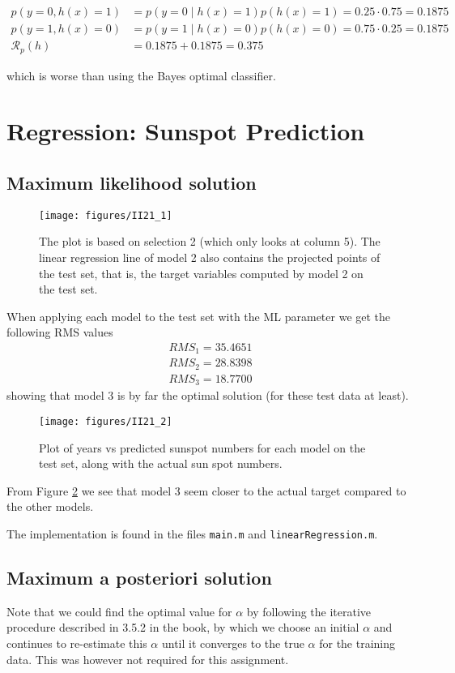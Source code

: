 \documentclass[a4paper, 11pt]{article}
\begin{document}
\begin{align*}
p(y=0,h(x)=1) &= p(y=0 \;|\; h(x)=1)p(h(x)=1) = 0.25 \cdot 0.75 = 0.1875 \\
p(y=1,h(x)=0) &= p(y=1 \;|\; h(x)=0)p(h(x)=0) = 0.75 \cdot 0.25 = 0.1875 \\
\mathcal{R}_p (h) &= 0.1875 + 0.1875 = 0.375
\end{align*}

which is worse than using the Bayes optimal classifier.

\section{Regression: Sunspot Prediction}
\subsection{Maximum likelihood solution}
\begin{figure}[H]
    \centering
    \texttt{[image: figures/II21\_1]}
    \caption{The plot is based on selection 2 (which only looks at column 5). The linear regression line of model 2 also contains the projected points of the test set, that is, the target variables computed by model 2 on the test set.}
    \label{fig:II21_1}
\end{figure}

When applying each model to the test set with the ML parameter we get the following RMS values
\begin{align*}
    RMS_1 = 35.4651\\
    RMS_2 = 28.8398\\
    RMS_3 = 18.7700
\end{align*}
showing that model 3 is by far the optimal solution (for these test data at least).

\begin{figure}[H]
    \centering
    \texttt{[image: figures/II21\_2]}
    \caption{Plot of years vs predicted sunspot numbers for each model on the test set, along with the actual sun spot numbers.}
    \label{fig:II21_2}
\end{figure}
From Figure \ref{fig:II21_2} we see that model 3 seem closer to the actual target compared to the other models.

The implementation is found in the files \texttt{main.m} and \texttt{linearRegression.m}.

\subsection{Maximum a posteriori solution}
Note that we could find the optimal value for $\alpha$ by following the iterative procedure described in 3.5.2 in the book, by which we choose an initial $\alpha$ and continues to re-estimate this $\alpha$ until it converges to the true $\alpha$ for the training data. This was however not required for this assignment.
\end{document}
